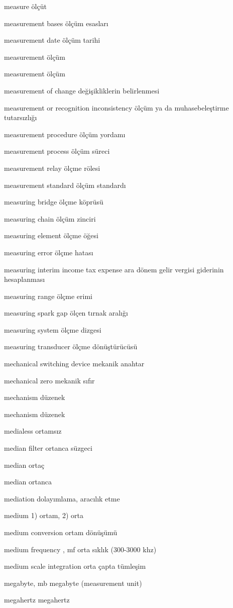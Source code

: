 \documentclass[12pt,fleqn]{article}\usepackage{../../common}
\begin{document}
measure ölçüt

measurement bases ölçüm esasları

measurement date ölçüm tarihi

measurement ölçüm

measurement ölçüm

measurement of change değişikliklerin belirlenmesi

measurement or recognition inconsistency ölçüm ya da muhasebeleştirme tutarsızlığı

measurement procedure ölçüm yordamı

measurement process ölçüm süreci

measurement relay ölçme rölesi

measurement standard ölçüm standardı

measuring bridge ölçme köprüsü

measuring chain ölçüm zinciri

measuring element ölçme öğesi

measuring error ölçme hatası

measuring interim income tax expense ara dönem gelir vergisi giderinin hesaplanması

measuring range ölçme erimi

measuring spark gap ölçen tırnak aralığı

measuring system ölçme dizgesi

measuring transducer ölçme dönüştürücüsü

mechanical switching device mekanik anahtar

mechanical zero mekanik sıfır

mechanism düzenek

mechanism düzenek

medialess ortamsız

median filter ortanca süzgeci

median ortaç

median ortanca

mediation dolayımlama, aracılık etme

medium 1) ortam, 2) orta

medium conversion ortam dönüşümü

medium frequency , mf orta sıklık (300-3000 khz)

medium scale integration orta çapta tümleşim

megabyte, mb megabyte (measurement unit)

megahertz megahertz
\end{document}
